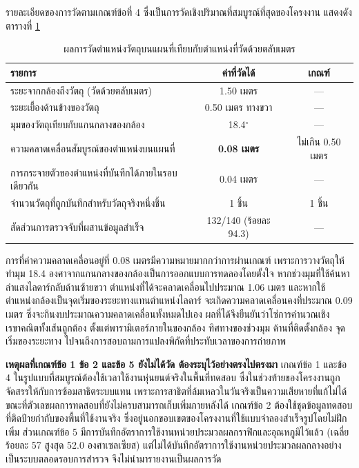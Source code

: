 \documentclass[a4paper,12pt]{report}
\begin{document}
รายละเอียดของการวัดตามเกณฑ์ข้อที่ 4 ซึ่งเป็นการวัดเชิงปริมาณที่สมบูรณ์ที่สุดของโครงงาน
แสดงดังตารางที่ \ref{tab:benchcheck}

\begin{table}[htbp]
\centering
\caption[ผลการวัดตำแหน่งวัตถุบนแผนที่เทียบกับตำแหน่งที่วัดด้วยตลับเมตร (บทที่ 5)]{ผลการวัดตำแหน่งวัตถุบนแผนที่เทียบกับตำแหน่งที่วัดด้วยตลับเมตร}
\label{tab:benchcheck}
\small
\begin{tabularx}{\textwidth}{|X|c|c|}
\hline
\textbf{รายการ} & \textbf{ค่าที่วัดได้} & \textbf{เกณฑ์} \\
\hline
ระยะจากกล้องถึงวัตถุ (วัดด้วยตลับเมตร) & 1.50 เมตร & --- \\
\hline
ระยะเยื้องด้านข้างของวัตถุ & 0.50 เมตร ทางขวา & --- \\
\hline
มุมของวัตถุเทียบกับแกนกลางของกล้อง & 18.4$^\circ$ & --- \\
\hline
ความคลาดเคลื่อนสัมบูรณ์ของตำแหน่งบนแผนที่ & \textbf{0.08 เมตร} & ไม่เกิน 0.50 เมตร \\
\hline
การกระจายตัวของตำแหน่งที่บันทึกได้ภายในรอบเดียวกัน & 0.04 เมตร & --- \\
\hline
จำนวนวัตถุที่ถูกบันทึกสำหรับวัตถุจริงหนึ่งชิ้น & 1 ชิ้น & 1 ชิ้น \\
\hline
สัดส่วนการตรวจจับที่ผสานข้อมูลสำเร็จ & 132/140 (ร้อยละ 94.3) & --- \\
\hline
\end{tabularx}
\end{table}

การที่ค่าความคลาดเคลื่อนอยู่ที่ 0.08 เมตรมีความหมายมากกว่าการผ่านเกณฑ์
เพราะการวางวัตถุให้ทำมุม 18.4 องศาจากแกนกลางของกล้องเป็นการออกแบบการทดลองโดยตั้งใจ
หากช่วงมุมที่ใช้ค้นหาลำแสงไลดาร์กลับด้านซ้ายขวา
ตำแหน่งที่ได้จะคลาดเคลื่อนไปประมาณ 1.06 เมตร
และหากใช้ตำแหน่งกล้องเป็นจุดเริ่มของระยะทางแทนตำแหน่งไลดาร์
จะเกิดความคลาดเคลื่อนคงที่ประมาณ 0.09 เมตร ซึ่งจะกินงบประมาณความคลาดเคลื่อนทั้งหมดไปเอง
ผลที่ได้จึงยืนยันว่าโซ่การคำนวณเชิงเรขาคณิตทั้งเส้นถูกต้อง
ตั้งแต่พารามิเตอร์ภายในของกล้อง ทิศทางของช่วงมุม ด้านที่ติดตั้งกล้อง
จุดเริ่มของระยะทาง ไปจนถึงการสอบถามการแปลงพิกัดที่ประทับเวลาของการถ่ายภาพ

\textbf{เหตุผลที่เกณฑ์ข้อ 1 ข้อ 2 และข้อ 5 ยังไม่ได้วัด ต้องระบุไว้อย่างตรงไปตรงมา}
เกณฑ์ข้อ 1 และข้อ 4 ในรูปแบบที่สมบูรณ์ต้องใช้เวลาใช้งานหุ่นยนต์จริงในพื้นที่ทดสอบ
ซึ่งในช่วงท้ายของโครงงานถูกจัดสรรให้กับการซ้อมสาธิตระบบแทน
เพราะการสาธิตที่ล้มเหลวในวันจริงเป็นความเสียหายที่แก้ไม่ได้
ขณะที่ตัวเลขผลการทดสอบที่ยังไม่ครบสามารถเก็บเพิ่มภายหลังได้
เกณฑ์ข้อ 2 ต้องใช้ชุดข้อมูลทดสอบที่ติดป้ายกำกับของพื้นที่ใช้งานจริง
ซึ่งอยู่นอกขอบเขตของโครงงานที่ใช้แบบจำลองสำเร็จรูปโดยไม่ฝึกเพิ่ม
ส่วนเกณฑ์ข้อ 5 มีการบันทึกอัตราการใช้งานหน่วยประมวลผลกราฟิกและอุณหภูมิไว้แล้ว
(เฉลี่ยร้อยละ 57 สูงสุด 52.0 องศาเซลเซียส)
แต่ไม่ได้บันทึกอัตราการใช้งานหน่วยประมวลผลกลางอย่างเป็นระบบตลอดรอบการสำรวจ
จึงไม่นำมารายงานเป็นผลการวัด
\end{document}
